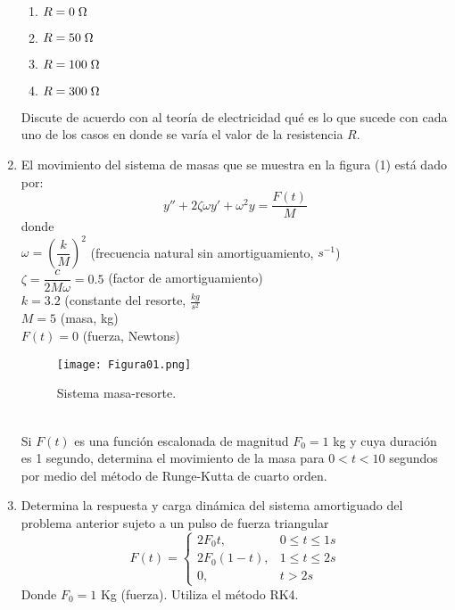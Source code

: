 \documentclass[12pt]{article}
\begin{document}
\begin{enumerate}
\begin{enumerate}
\item $R = 0 \hspace{0.1cm} \Omega$
\item $R = 50 \hspace{0.1cm} \Omega$
\item $R = 100 \hspace{0.1cm} \Omega$
\item $R = 300 \hspace{0.1cm} \Omega$
\end{enumerate}
Discute de acuerdo con al teoría de electricidad qué es lo que sucede con cada uno de los casos en donde se varía el valor de la resistencia $R$.
\item El movimiento del sistema de masas que se muestra en la figura (1) está dado por:
\[ y'' + 2 \zeta \omega y' + \omega^{2}y = \dfrac{F(t)}{M}\]
donde \\ 
$\omega = \left( \dfrac{k}{M} \right)^{2}$ (frecuencia natural sin amortiguamiento, $s^{-1}$) \\
$\zeta = \dfrac{c}{2M\omega}=0.5$ (factor de amortiguamiento) \\
$k = 3.2$ (constante del resorte, $\frac{kg}{s^{2}}$ \\
$M=5$ (masa, kg) \\
$F(t) = 0$ (fuerza, Newtons)
\begin{figure}[!h]
	\centering
	\texttt{[image: Figura01.png]}  
	\label{fig:figura01}
	\caption{Sistema masa-resorte.}
\end{figure}
\\Si $F(t)$ es una función escalonada de magnitud $F_{0}=1$ kg y cuya duración es 1 segundo, determina el movimiento de la masa para $0<t<10$ segundos por medio del método de Runge-Kutta de cuarto orden.
\item Determina la respuesta y carga dinámica del sistema amortiguado del problema anterior sujeto a un pulso de fuerza triangular
\begin{equation*}
F(t) =
	\begin{cases}
2F_{0}t,  & 0 \leq t \leq 1 s\\
2F_{0}(1-t), & 1 \leq t \leq 2 s\\
0, & t>2 s
\end{cases}
\end{equation*}
Donde $F_{0}=1$ Kg (fuerza). Utiliza el método RK4.
\end{enumerate}
\end{document}
